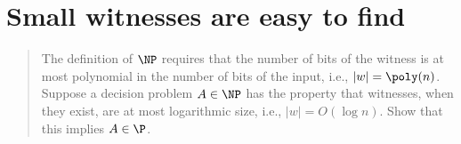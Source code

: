 \section*{Small witnesses are easy to find}
    \begin{quote}
    The definition of $\NP$ requires that the number of bits of the witness is at most polynomial in the number of bits of the input, i.e., $|w| = \poly(n)$.
    Suppose a decision problem $A \in \NP$ has the property that witnesses,
    when they exist, are at most logarithmic size,
    i.e., $|w| = O(\log n)$.
    Show that this implies $A \in \P$.
    \end{quote}
